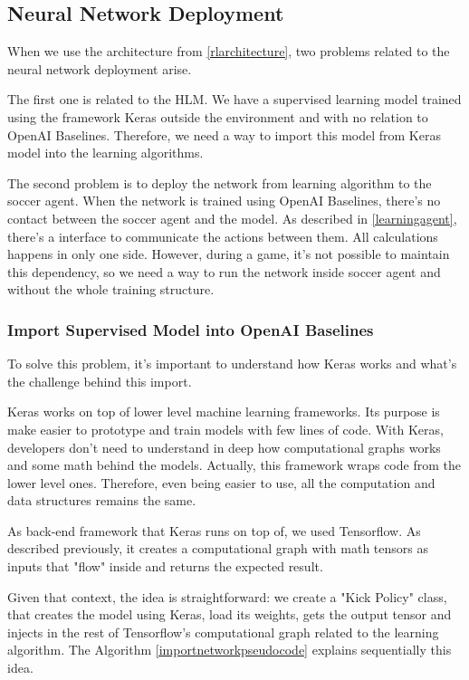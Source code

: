\subsection{Neural Network Deployment}

When we use the architecture from \ref{rlarchitecture}, two problems related to the neural network deployment arise.

The first one is related to the HLM. We have a supervised learning model trained using the framework Keras outside the environment and with no relation to OpenAI Baselines. Therefore, we need a way to import this model from Keras model into the learning algorithms.

The second problem is to deploy the network from learning algorithm to the soccer agent. When the network is trained using OpenAI Baselines, there's no contact between the soccer agent and the model. As described in \ref{learningagent}, there's a interface to communicate the actions between them. All calculations happens in only one side. However, during a game, it's not possible to maintain this dependency, so we need a way to run the network inside soccer agent and without the whole training structure.

\subsubsection{Import Supervised Model into OpenAI Baselines}

To solve this problem, it's important to understand how Keras works and what's the challenge behind this import. 

Keras works on top of lower level machine learning frameworks. Its purpose is make easier to prototype and train models with few lines of code. With Keras, developers don't need to understand in deep how computational graphs works and some math behind the models. Actually, this framework wraps code from the lower level ones. Therefore, even being easier to use, all the computation and data structures remains the same.

As back-end framework that Keras runs on top of, we used Tensorflow. As described previously, it creates a computational graph with math tensors as inputs that "flow" inside and returns the expected result.

Given that context, the idea is straightforward: we create a "Kick Policy" class, that creates the model using Keras, load its weights, gets the output tensor and injects in the rest of Tensorflow's computational graph related to the learning algorithm. The Algorithm \ref{importnetworkpseudocode} explains sequentially this idea.

